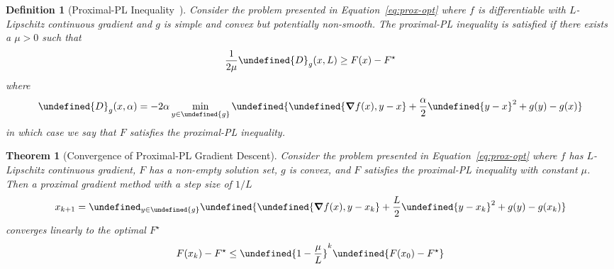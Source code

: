 \documentclass[11pt]{article}  %
\newtheorem{theorem}{Theorem}
\newtheorem{definition}{Definition}
\let\mcal\undefined
\newcommand{\mcal}[1]{\mathcal{#1}}
\let\parens\undefined
\newcommand{\parens}[1]{\left(#1\right)}
\let\brackets\undefined
\newcommand{\brackets}[1]{\left[#1\right]}
\let\braces\undefined
\newcommand{\braces}[1]{\left\{#1\right\}}
\let\angles\undefined
\newcommand{\angles}[1]{\langle#1\rangle}
\let\norm\undefined
\newcommand{\norm}[1]{\lVert #1 \rVert}
\let\dom\undefined
\DeclareMathOperator{\dom}{dom}
\let\argmin\undefined
\DeclareMathOperator*{\argmin}{arg\,min}
\begin{document}
\begin{definition}[Proximal-PL Inequality~\cite{karimi2016linear}]
  Consider the problem presented in Equation~\ref{eq:prox-opt}
  where \(f\) is differentiable with \(L\)-Lipschitz continuous gradient
  and \(g\) is simple and convex but potentially non-smooth.
  The proximal-PL inequality is satisfied if there exists
  a \(\mu > 0\) such that
  \begin{align}
    \frac{1}{2 \mu} \mcal{D}_g (x, L) \geq F(x) - F^\star
  \end{align}
  where
  \begin{align}
    \mcal{D}_g (x, \alpha)
      = - 2 \alpha \min_{y \in \dom{g}}
        \braces{\angles{\grad f(x), y - x} + \frac{\alpha}{2} \norm{y - x}^2
            + g(y) - g(x)}
  \end{align}
  in which case we say that \(F\) satisfies the proximal-PL inequality.
\end{definition}


\begin{theorem}[Convergence of Proximal-PL Gradient Descent]
  Consider the problem presented in Equation~\ref{eq:prox-opt}
  where \(f\) has \(L\)-Lipschitz continuous gradient,
  \(F\) has a non-empty solution set, \(g\) is convex,
  and \(F\) satisfies the proximal-PL inequality with constant \(\mu\).
  Then a proximal gradient method with a step size of \(1/L\)
  \begin{align}
    x_{k + 1} =
      \argmin_{y \in \dom{g}}
        \braces{\angles{\grad f(x), y - x_{k}}
              + \frac{L}{2} \norm{y - x_k}^2
              + g(y) - g(x_k)}
  \end{align}
  converges linearly to the optimal \(F^\star\)
  \begin{align}
    F(x_k) - F^\star \leq \parens{1 - \frac{\mu}{L}}^k \brackets{F(x_0) - F^\star}   
  \end{align}
\end{theorem}
\end{document}
